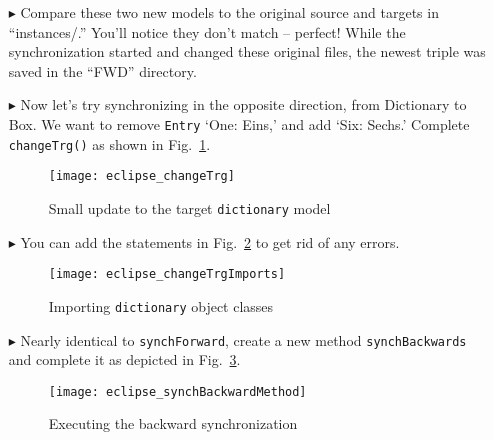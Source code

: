 \begin{itemize}
\item[$\blacktriangleright$] Compare these two new models to the original source and targets in ``instances/.'' You'll notice they don't match -- perfect! While
the synchronization started and changed these original files, the newest triple was saved in the ``FWD'' directory.

\item[$\blacktriangleright$] Now let's try synchronizing in the opposite direction, from Dictionary to Box. We want to remove \texttt{Entry} `One: Eins,' and
add `Six: Sechs.' Complete \texttt{changeTrg()} as shown in Fig.~\ref{eclipse:changeTrg}.

\begin{figure}[htbp]
\begin{center}
  \texttt{[image: eclipse\_changeTrg]}
  \caption{Small update to the target \texttt{dictionary} model}
  \label{eclipse:changeTrg}
\end{center}
\end{figure}

\item[$\blacktriangleright$] You can add the statements in Fig.~\ref{eclipse:changeTrgImports} to get rid of any errors.

\vspace{0.5cm}

\begin{figure}[htbp]
\begin{center}
  \texttt{[image: eclipse\_changeTrgImports]}
  \caption{Importing \texttt{dictionary} object classes}
  \label{eclipse:changeTrgImports}
\end{center}
\end{figure}

\item[$\blacktriangleright$] Nearly identical to \texttt{synchForward}, create a new method \texttt{synchBackwards} and complete it as depicted in
Fig.~\ref{eclipse:SynchBackwardMethod}.

\vspace{0.5cm}

\begin{figure}[htbp]
\begin{center}
  \texttt{[image: eclipse\_synchBackwardMethod]}
  \caption{Executing the backward synchronization}
  \label{eclipse:SynchBackwardMethod}
\end{center}
\end{figure}


\end{itemize}
